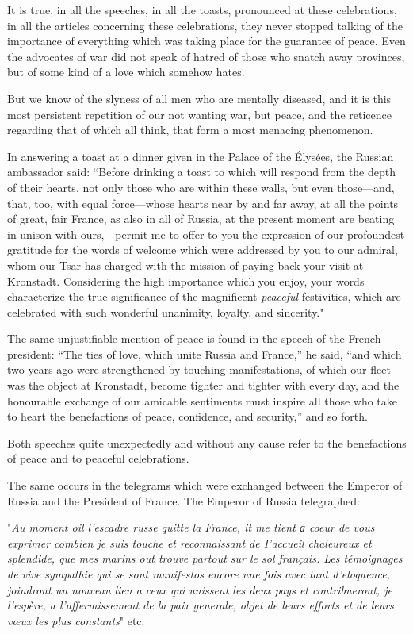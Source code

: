 \documentclass{book}
\begin{document}
It is true, in all the speeches, in all the toasts, pronounced at these celebrations, in all the articles concerning these celebrations, they never stopped talking of the importance of everything which was taking place for the guarantee of peace. Even the advocates of war did not speak of hatred of those who snatch away provinces, but of some kind of a love which somehow hates.

But we know of the slyness of all men who are mentally diseased, and it is this most persistent repetition of our not wanting war, but peace, and the reticence regarding that of which all think, that form a most menacing phenomenon.

In answering a toast at a dinner given in the Palace of the Élysées, the Russian ambassador said: “Before drinking a toast to which will respond from the depth of their hearts, not only those who are within these walls, but even those—and, that, too, with equal force—whose hearts near by and far away, at all the points of great, fair France, as also in all of Russia, at the present moment are beating in unison with ours,—permit me to offer to you the expression of our profoundest gratitude for the words of welcome which were addressed by you to our admiral, whom our Tsar has charged with the mission of paying back your visit at Kronstadt. Considering the high importance which you enjoy, your words characterize the true significance of the magnificent \emph{peaceful} festivities, which are celebrated with such wonderful unanimity, loyalty, and sincerity."

The same unjustifiable mention of peace is found in the speech of the French president: “The ties of love, which unite Russia and France,” he said, “and which two years ago were strengthened by touching manifestations, of which our fleet was the object at Kronstadt, become tighter and tighter with every day, and the honourable exchange of our amicable sentiments must inspire all those who take to heart the benefactions of peace, confidence, and security,” and so forth.

Both speeches quite unexpectedly and without any cause refer to the benefactions of peace and to peaceful celebrations.

The same occurs in the telegrams which were exchanged between the Emperor of Russia and the President of France. The Emperor of Russia telegraphed:

"\emph{Au moment oil l’escadre russe quitte la France, it me tient а coeur de vous exprimer combien je suis touche et reconnaissant de I’accueil chaleureux et splendide, que mes marins out trouve partout sur le sol français. Les témoignages de vive sympathie qui se sont manifestos encore une fois avec tant d'eloquence, joindront un nouveau lien a ceux qui unissent les deux pays et contribueront, je l’espère, a l'affermissement de la paix generale, objet de leurs efforts et de leurs vœux les plus constants}" etc.
\end{document}
